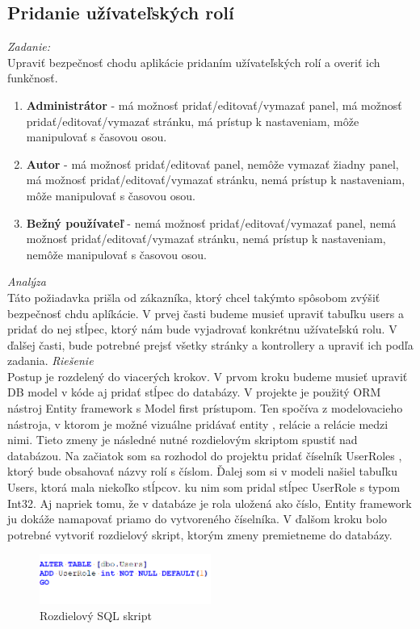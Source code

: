 \documentclass[11pt, oneside]{report}
\begin{document}
\subsection*{Pridanie užívateľských rolí}
\textit{Zadanie:}\\
Upraviť bezpečnosť chodu aplikácie pridaním užívateľských rolí a overiť ich funkčnosť.
\begin{enumerate}
\item \textbf{Administrátor} - má možnosť pridať/editovať/vymazať panel, má možnosť pridať/editovať/vymazať stránku, má prístup k nastaveniam, môže manipulovať s časovou osou.
\item \textbf{Autor} - má možnosť pridať/editovať panel, nemôže vymazať žiadny panel, má možnosť pridať/editovať/vymazať stránku, nemá prístup k nastaveniam, môže manipulovať s časovou osou.
\item \textbf{Bežný používateľ} - nemá možnosť pridať/editovať/vymazať panel, nemá možnosť pridať/editovať/vymazať stránku, nemá prístup k nastaveniam, nemôže manipulovať s časovou osou.
\end{enumerate}
\textit{Analýza}\\
Táto požiadavka prišla od zákazníka, ktorý chcel takýmto spôsobom zvýšiť bezpečnosť chdu aplíkácie.
V prvej časti budeme musieť upraviť tabuľku \textsf{users} a pridať do nej stĺpec, ktorý nám bude vyjadrovať konkrétnu užívateľskú rolu. V ďalšej časti, bude potrebné prejsť všetky stránky a kontrollery a upraviť ich podľa zadania. 
\textit{Riešenie}\\
Postup je rozdelený do viacerých krokov. V prvom kroku budeme musieť upraviť DB model v kóde aj  pridať stĺpec do databázy. V projekte je použitý ORM nástroj Entity framework s Model first prístupom. Ten spočíva z modelovacieho nástroja, v ktorom je možné vizuálne pridávať entity , relácie a relácie medzi nimi. Tieto zmeny je následné nutné rozdielovým skriptom spustiť nad databázou. Na začiatok som sa rozhodol do projektu pridať číselník \textsf{UserRoles} , ktorý bude obsahovať  názvy rolí s číslom. Ďalej som si v modeli našiel tabuľku Users, ktorá mala niekoľko stĺpcov.  ku nim som pridal stĺpec \textsf{UserRole} s typom \textsf{Int32}. Aj napriek tomu, že v databáze je rola uložená ako číslo, Entity framework ju dokáže namapovať priamo do vytvoreného číselníka. V ďalšom kroku bolo potrebné vytvoriť rozdielový skript, ktorým zmeny premietneme do databázy.
\begin{figure}[h]
    \centering
    \includegraphics[width=0.5\textwidth]{adduserrole}
    \caption{Rozdielový SQL skript}
    \label{fig:mesh1}
\end{figure}
\end{document}
